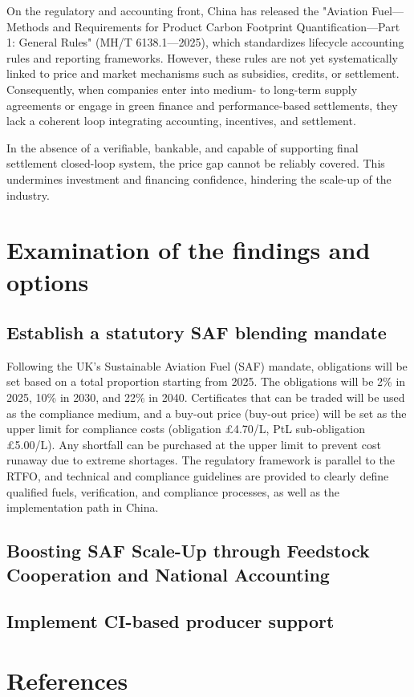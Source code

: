\documentclass[a4paper,11pt]{article}
\begin{document}
On the regulatory and accounting front, China has released the "Aviation Fuel---Methods and Requirements for Product Carbon Footprint Quantification---Part 1: General Rules" (MH/T 6138.1---2025), which standardizes lifecycle accounting rules and reporting frameworks. However, these rules are not yet systematically linked to price and market mechanisms such as subsidies, credits, or settlement. Consequently, when companies enter into medium- to long-term supply agreements or engage in green finance and performance-based settlements, they lack a coherent loop integrating accounting, incentives, and settlement.

In the absence of a verifiable, bankable, and capable of supporting final settlement closed-loop system, the price gap cannot be reliably covered. This undermines investment and financing confidence, hindering the scale-up of the industry.




\section{Examination of the findings and options}

\subsection{Establish a statutory SAF blending mandate}
Following the UK's Sustainable Aviation Fuel (SAF) mandate, obligations will be set based on a total proportion starting from 2025. The obligations will be 2\% in 2025, 10\% in 2030, and 22\% in 2040. Certificates that can be traded will be used as the compliance medium, and a buy-out price (buy-out price) will be set as the upper limit for compliance costs (obligation £4.70/L, PtL sub-obligation £5.00/L). Any shortfall can be purchased at the upper limit to prevent cost runaway due to extreme shortages. The regulatory framework is parallel to the RTFO, and technical and compliance guidelines are provided to clearly define qualified fuels, verification, and compliance processes, as well as the implementation path in China.
\subsection{Boosting SAF Scale-Up through Feedstock Cooperation and National Accounting}

\subsection{Implement CI-based producer support}



\section{References}
\end{document}
